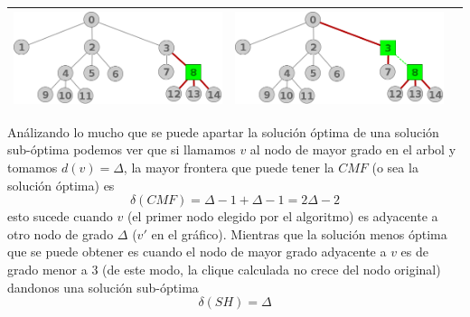 \begin{center}
\begin{tabular}{ |c||c||c| }
			\includegraphics[scale = 0.3]{img/ej3/constructiva_golosa/tree_st11.png} &
			\includegraphics[scale = 0.3]{img/ej3/constructiva_golosa/tree_st12.png} \\
			\hline
		\end{tabular}
	\end{center}

An\'alizando lo mucho que se puede apartar la soluci\'on \'optima de una soluci\'on sub-\'optima
podemos ver que si llamamos $v$ al nodo de mayor grado en el arbol y tomamos $d(v) = \Delta$, la
mayor frontera que puede tener la $CMF$ (o sea la soluci\'on \'optima) es
\[ \delta(CMF) = \Delta -1 + \Delta -1 = 2 \Delta -2 \]
esto sucede cuando $v$ (el primer nodo elegido por el algoritmo) es adyacente a otro nodo de grado
$\Delta$ ($v'$ en el gr\'afico). Mientras que la soluci\'on menos \'optima que se puede obtener es 
cuando el nodo de mayor grado adyacente a $v$ es de grado menor a 3 
(de este modo, la clique calculada no crece del nodo original) dandonos una soluci\'on sub-\'optima
\[ \delta(SH) = \Delta \]

